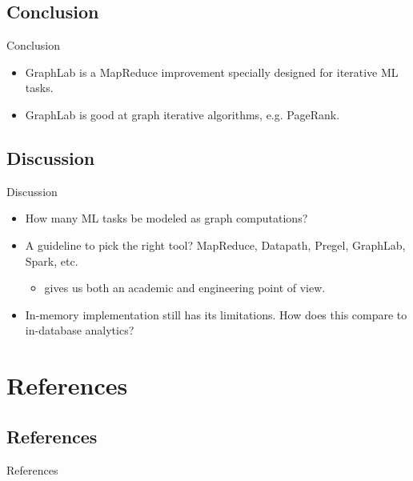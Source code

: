 \documentclass[onlymath,xcolor=pdftex,dvipsnames,table]{beamer}
\theoremstyle{remark} %
\begin{document}
\subsection{Conclusion}
\begin{frame}{Conclusion}
\begin{itemize}
  \item GraphLab is a MapReduce improvement specially designed for iterative ML tasks.
  \item GraphLab is good at graph iterative algorithms, e.g. PageRank.
\end{itemize}
\end{frame}


\subsection{Discussion}
\begin{frame}{Discussion}
\begin{itemize}
  \item How many ML tasks be modeled as graph computations?
  \item A guideline to pick the right tool? MapReduce, Datapath, Pregel, GraphLab, Spark, etc.
  \begin{itemize}
    \item \cite{lin2012mapreduce} gives us both an academic and engineering point of view.
  \end{itemize}
  \item In-memory implementation still has its limitations. How does this compare to in-database analytics?
\end{itemize}
\end{frame}


\section{References}
\subsection{References}
\begin{frame}[allowframebreaks]{References}
  
  
\end{frame}
\end{document}
